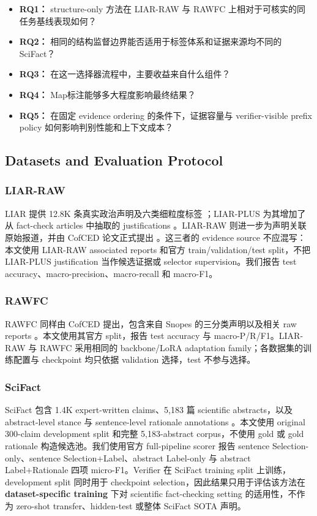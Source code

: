 \documentclass[letterpaper]{article}
\begin{document}
\begin{itemize}
\item \textbf{RQ1：} structure-only 方法在 LIAR-RAW 与 RAWFC 上相对于可核实的同任务基线表现如何？
\item \textbf{RQ2：} 相同的结构监督边界能否适用于标签体系和证据来源均不同的 SciFact？
\item \textbf{RQ3：} 在这一选择器流程中，主要收益来自什么组件？
\item \textbf{RQ4：} Map标注能够多大程度影响最终结果？
\item \textbf{RQ5：} 在固定 evidence ordering 的条件下，证据容量与 verifier-visible prefix policy 如何影响判别性能和上下文成本？
\end{itemize}

\subsection{Datasets and Evaluation Protocol}

\subsubsection{LIAR-RAW}

LIAR 提供 12.8K 条真实政治声明及六类细粒度标签 \citep{Wang2017LIAR}；LIAR-PLUS 为其增加了从 fact-check articles 中抽取的 justifications \citep{Alhindi2018LIARPlus}。LIAR-RAW 则进一步为声明关联原始报道，并由 CofCED 论文正式提出 \citep{Yang2022CofCED}。这三者的 evidence source 不应混写：本文使用 LIAR-RAW associated reports 和官方 train/validation/test split，不把 LIAR-PLUS justification 当作候选证据或 selector supervision。我们报告 test accuracy、macro-precision、macro-recall 和 macro-F1。

\subsubsection{RAWFC}

RAWFC 同样由 CofCED 提出，包含来自 Snopes 的三分类声明以及相关 raw reports \citep{Yang2022CofCED}。本文使用其官方 split，报告 test accuracy 与 macro-P/R/F1。LIAR-RAW 与 RAWFC 采用相同的 backbone/LoRA adaptation family；各数据集的训练配置与 checkpoint 均只依据 validation 选择，test 不参与选择。

\subsubsection{SciFact}

SciFact 包含 1.4K expert-written claims、5,183 篇 scientific abstracts，以及 abstract-level stance 与 sentence-level rationale annotations \citep{Wadden2020SciFact}。本文使用 original 300-claim development split 和完整 5,183-abstract corpus，不使用 gold \texttt{} 或 gold rationale 构造候选池。我们使用官方 full-pipeline scorer 报告 sentence Selection-only、sentence Selection+Label、abstract Label-only 与 abstract Label+Rationale 四项 micro-F1。Verifier 在 SciFact training split 上训练，development split 同时用于 checkpoint selection，因此结果只用于评估该方法在 \textbf{dataset-specific training} 下对 scientific fact-checking setting 的适用性，不作为 zero-shot transfer、hidden-test 或整体 SciFact SOTA 声明。
\end{document}
